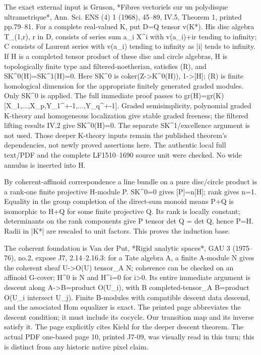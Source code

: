 \documentclass[11pt]{article}
\begin{document}
The exact external input is Gruson, *Fibres vectoriels sur un polydisque ultrametrique*, Ann. Sci. ENS (4) 1 (1968), 45--89, IV.5, Theorem 1, printed pp.79--81. For a complete real-valued K, put D=Q tensor v(K*). His disc algebra T\_(1,r), r in D, consists of series sum a\_i X\textasciicircum{}i with v(a\_i)+ir tending to infinity; C consists of Laurent series with v(a\_i) tending to infinity as |i| tends to infinity. If H is a completed tensor product of these disc and circle algebras, H is topologically finite type and filtered-noetherian, satisfies (R), and SK\textasciicircum{}0(H)=SK\textasciicircum{}1(H)=0. Here SK\textasciicircum{}0 is coker(Z->K\textasciicircum{}0(H)), 1->[H]; (R) is finite homological dimension for the appropriate finitely generated graded modules. Only SK\textasciicircum{}0 is applied. The full immediate proof passes to gr(H)=gr(K)[X\_1,...,X\_p,Y\_1\textasciicircum{}+-1,...,Y\_q\textasciicircum{}+-1]. Graded semisimplicity, polynomial graded K-theory and homogeneous localization give stable graded freeness; the filtered lifting results IV.2 give SK\textasciicircum{}0(H)=0. The separate SK\textasciicircum{}1/excellence argument is not used. Those deeper K-theory inputs remain the published theorem's dependencies, not newly proved assertions here. The authentic local full text/PDF and the complete LF1510--1690 source unit were checked. No wide annulus is inserted into H.

By coherent-affinoid correspondence a line bundle on a pure disc/circle product is a rank-one finite projective H-module P. SK\textasciicircum{}0=0 gives [P]=n[H]; rank gives n=1. Equality in the group completion of the direct-sum monoid means P+Q is isomorphic to H+Q for some finite projective Q. Its rank is locally constant; determinants on the rank components give P tensor det Q = det Q, hence P=H. Radii in |K*| are rescaled to unit factors. This proves the induction base.

The coherent foundation is Van der Put, *Rigid analytic spaces*, GAU 3 (1975--76), no.2, expose J7, 2.14--2.16.3: for a Tate algebra A, a finite A-module N gives the coherent sheaf U->O(U) tensor\_A N; coherence can be checked on an affinoid G-cover; H\textasciicircum{}0 is N and H\textasciicircum{}i=0 for i>0. Its entire immediate argument is descent along A->B=product O(U\_i), with B completed-tensor\_A B=product O(U\_i intersect U\_j). Finite B-modules with compatible descent data descend, and the associated Hom equalizer is exact. The printed page abbreviates the descent condition; it must include its cocycle. Our transition map and its inverse satisfy it. The page explicitly cites Kiehl for the deeper descent theorem. The actual PDF one-based page 10, printed J7-09, was visually read in this turn; this is distinct from any historic native pixel claim.
\end{document}
